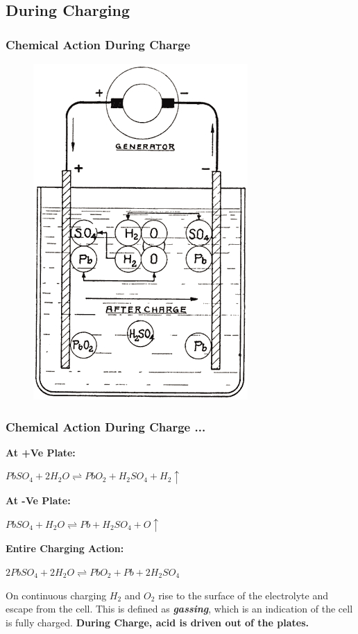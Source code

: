 \documentclass{beamer}
\begin{document}
\subsection{During Charging}

\begin{frame}    %
  \frametitle{Chemical Action During Charge}
  \begin{figure}
    \includegraphics[width=0.4\linewidth]{./Resources/Images/chemistry_during_charge.jpg}
  \end{figure}
\end{frame}

\begin{frame}    %
  \frametitle{Chemical Action During Charge ...}
  \fontsize{8pt}{12}\selectfont
    
  \textbf{At +Ve Plate:}
  \begin{center}
    $ PbSO_{4} + 2H_{2}O \rightleftharpoons PbO_{2} + H_{2}SO_{4} + H_{2} \uparrow$
  \end{center}
  \textbf{At -Ve Plate:}
  \begin{center}
    $ PbSO_{4} + H_{2}O \rightleftharpoons Pb + H_{2}SO_{4} + O \uparrow$
  \end{center}  
  \textbf{Entire Charging Action:}
  \begin{center}
    $ 2PbSO_{4} + 2H_{2}O \rightleftharpoons PbO_{2} + Pb + 2H_{2}SO_{4} $
  \end{center}  


On continuous charging $H_{2}$ and $O_{2}$ rise to the surface of the electrolyte and escape from the cell. 
This is defined as \textbf{\textit{gassing}}, which is an indication of the cell is fully charged. \textbf{During Charge,
acid is driven out of the plates.}
\end{frame}
\end{document}
